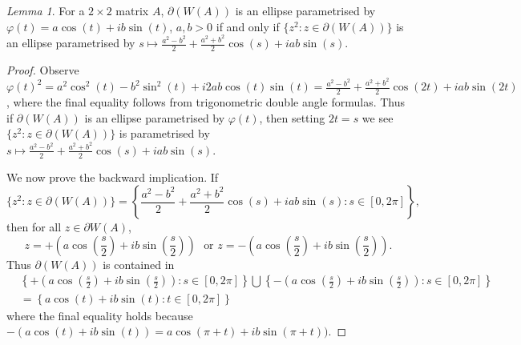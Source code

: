 \documentclass[12pt]{article}
\theoremstyle{plain}
\theoremstyle{definition}
\theoremstyle{remark}
\renewcommand{\phi}{\varphi}
\newtheorem{Lemma}[Theorem]{Lemma}
\numberwithin{equation}{section}
\begin{document}
\begin{Lemma}
    For a $ 2 \times 2$ matrix $A$, $\partial(W(A))$ is an ellipse parametrised by $\phi(t) = a \cos(t) + ib \sin(t)$, $a,b >0$ if and only if $ \{ z^2 : z \in \partial(W(A)) \} $ is an ellipse parametrised by $ s \mapsto \frac{a^2 - b^2}{2} + \frac{a^2 + b^2}{2} \cos(s) + i ab \sin(s)$.
\end{Lemma}
\begin{proof}
    Observe $\phi(t)^2 = a^2 \cos^2(t) - b^2 \sin^2(t) + i2ab\cos(t)\sin(t) = \frac{a^2 - b^2}{2} + \frac{a^2 + b^2}{2} \cos(2t) + i ab \sin(2t)$, where the final equality follows from trigonometric double angle formulas. 
    Thus if $\partial(W(A))$ is an ellipse parametrised by $\phi(t)$, then setting $2t=s$ we see $ \{ z^2 : z \in \partial(W(A)) \} $ is parametrised by $ s \mapsto \frac{a^2 - b^2}{2} + \frac{a^2 + b^2}{2} \cos(s) + i ab \sin(s)$.
    
    We now prove the backward implication. If $$ \{ z^2 : z \in \partial(W(A)) \}  = \left\{ \frac{a^2 - b^2}{2} + \frac{a^2 + b^2}{2} \cos(s) + i ab \sin(s) : s \in [0,2 \pi] \right\},$$ then for all $z \in \partial W(A)$, \begin{equation}\label{star}
        z= +\left(a \cos\left(\frac{s}{2}\right) + ib \sin\left(\frac{s}{2}\right)\right) \, \, \text{   or } z =  -\left(a \cos\left(\frac{s}{2}\right) + ib \sin\left(\frac{s}{2}\right)\right).
    \end{equation} Thus $\partial(W(A))$ is contained in 
    \begin{align}
        &\left\{ +\left(a \cos\left(\frac{s}{2}\right) + ib \sin\left(\frac{s}{2}\right)\right): s \in [0, 2 \pi] \right\} \bigcup \left\{ - \left(a \cos\left(\frac{s}{2}\right) + ib \sin\left(\frac{s}{2}\right)\right): s \in [0, 2 \pi]  \right\} \\
        &= \left\{ a \cos\left(t\right) + ib \sin\left(t\right) :t \in [0,2\pi] \right\}
    \end{align}
     where the final equality holds because $-  \left(a \cos\left(t\right) + ib \sin\left(t\right)\right) = a \cos\left(\pi + t\right) + ib \sin\left(\pi + t\right))$. 


\end{proof}
\end{document}
